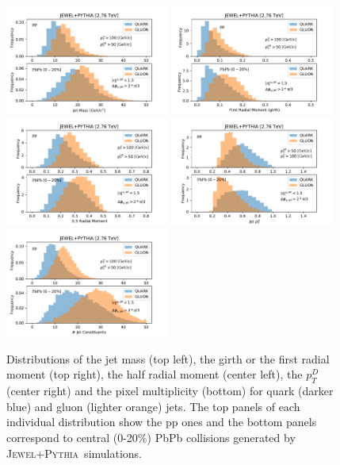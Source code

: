 \documentclass[notoc]{JHEP3}
\newcommand{\jwpy}{\textsc{Jewel+Pythia}~}
\begin{document}
\begin{figure}[h]
	   \centering
	   \includegraphics[width=0.48\textwidth]{plots/JEWEL_pp_pbpb020_jetMass}
	   \includegraphics[width=0.48\textwidth]{plots/JEWEL_pp_pbpb020_firstRadialMoment}
	   \includegraphics[width=0.48\textwidth]{plots/JEWEL_pp_pbpb020_halfRadialMoment}
	   \includegraphics[width=0.48\textwidth]{plots/JEWEL_pp_pbpb020_pTD}
	   \includegraphics[width=0.48\textwidth]{plots/JEWEL_pp_pbpb020_NumberjetConstituents}
	   \caption{Distributions of the jet mass (top left), the girth or the first radial moment (top right), the half radial moment (center left), the $p^{D}_{T}$ (center right) and the pixel multiplicity (bottom) for quark (darker blue) and gluon (lighter orange) jets. The top panels of each individual distribution show the pp ones and the bottom panels correspond to central (0-20\%) PbPb collisions generated by \jwpy simulations.}
	   \label{fig:jetdistributons_pp_pbpb}
	\end{figure}
\end{document}
